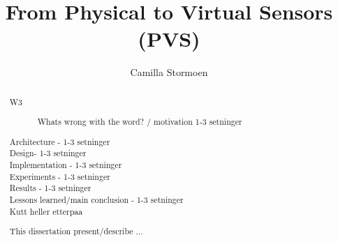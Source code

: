 \documentclass[USenglish]{uit-thesis}
\begin{document}

\title{From Physical to Virtual Sensors (PVS)}
\author{Camilla Stormoen}

\maketitle

\frontmatter




\begin{abstract}
\begin{description}
\item[W3] Whats wrong with the word? / motivation 1-3 setninger
\item[Architecture - 1-3 setninger]
\item [Design- 1-3 setninger]
\item[Implementation - 1-3 setninger]
\item[Experiments - 1-3 setninger]
\item[Results - 1-3 setninger]
\item[Lessons learned/main conclusion - 1-3 setninger]
\item [Kutt heller etterpaa] 
\end{description}

This dissertation present/describe ...
\end{abstract}


\end{document}
